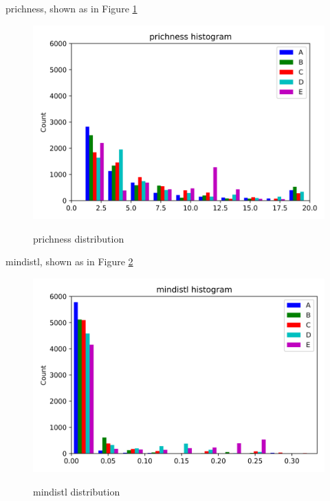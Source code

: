 \documentclass{article}
\begin{document}
prichness, shown as in Figure \ref{prichness-community}
\begin{figure}[htbp]
	\centering
	\includegraphics[width=\textwidth, keepaspectratio]{prichness-community.png}\\
	\caption{prichness distribution}
	\label{prichness-community}
\end{figure}


mindistl, shown as in Figure \ref{mindistl-community}
\begin{figure}[htbp]
	\centering
	\includegraphics[width=\textwidth, keepaspectratio]{mindistl-community.png}\\
	\caption{mindistl distribution}
	\label{mindistl-community}
\end{figure}
\end{document}
